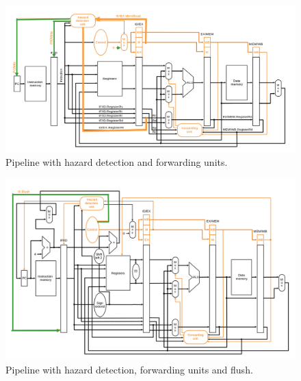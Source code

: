 \begin{figure}[H]
    \centering
    \includegraphics[scale=0.3]{img/pipeline-hazard.png}
    \caption{Pipeline with hazard detection and forwarding units.}
    \label{img:pipeline-hazard}
\end{figure}

\begin{figure}[H]
    \centering
    \includegraphics[scale=0.3]{img/pipeline-flush.png}
    \caption{Pipeline with hazard detection, forwarding units and flush.}
    \label{img:pipeline-flush}
\end{figure}

